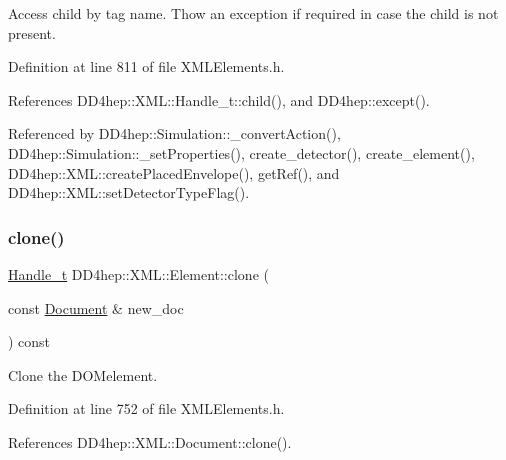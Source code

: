 Access child by tag name. Thow an exception if required in case the child is not present. 



Definition at line 811 of file X\+M\+L\+Elements.\+h.



References D\+D4hep\+::\+X\+M\+L\+::\+Handle\+\_\+t\+::child(), and D\+D4hep\+::except().



Referenced by D\+D4hep\+::\+Simulation\+::\+\_\+convert\+Action(), D\+D4hep\+::\+Simulation\+::\+\_\+set\+Properties(), create\+\_\+detector(), create\+\_\+element(), D\+D4hep\+::\+X\+M\+L\+::create\+Placed\+Envelope(), get\+Ref(), and D\+D4hep\+::\+X\+M\+L\+::set\+Detector\+Type\+Flag().

\hypertarget{class_d_d4hep_1_1_x_m_l_1_1_element_a9e2b0d580529920c58c998251658b904}{}\label{class_d_d4hep_1_1_x_m_l_1_1_element_a9e2b0d580529920c58c998251658b904} 
\subsubsection{\texorpdfstring{clone()}{clone()}\hspace{0.1cm}{\footnotesize\ttfamily [1/2]}}
{\footnotesize\ttfamily \hyperlink{class_d_d4hep_1_1_x_m_l_1_1_handle__t}{Handle\+\_\+t} D\+D4hep\+::\+X\+M\+L\+::\+Element\+::clone (\begin{DoxyParamCaption}\item[{const \hyperlink{class_d_d4hep_1_1_x_m_l_1_1_document}{Document} \&}]{new\+\_\+doc }\end{DoxyParamCaption}) const\hspace{0.3cm}{\ttfamily [inline]}}



Clone the D\+O\+Melement. 



Definition at line 752 of file X\+M\+L\+Elements.\+h.



References D\+D4hep\+::\+X\+M\+L\+::\+Document\+::clone().

\hypertarget{class_d_d4hep_1_1_x_m_l_1_1_element_a2bc885da092d05f5086c2538b87ccede}{}\label{class_d_d4hep_1_1_x_m_l_1_1_element_a2bc885da092d05f5086c2538b87ccede} 

